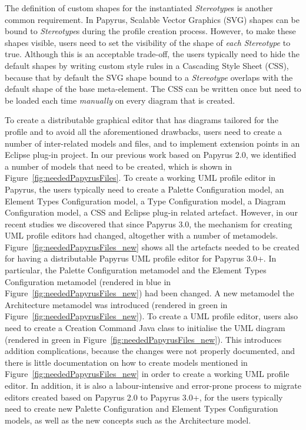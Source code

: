 The definition of custom shapes for the instantiated \textit{Stereotype}s is another common requirement. 
In Papyrus, Scalable Vector Graphics (SVG) shapes can be bound to \textit{Stereotype}s during the profile creation process. 
However, to make these shapes visible, users need to set the visibility of the shape of \textit{each} \textit{Stereotype} to true. 
Although this is an acceptable trade-off, the users typically need to hide the default shapes by writing custom style rules in a Cascading Style Sheet (CSS), because that by default the SVG shape bound to a \textit{Stereotype} overlaps with the default shape of the base meta-element.
The CSS can be written once but need to be loaded each time \textit{manually} on every diagram that is created. 

To create a distributable graphical editor that has diagrams tailored for the profile and to avoid all the aforementioned drawbacks, users need to create a number of inter-related models and files, and to implement extension points in an Eclipse plug-in project. 
In our previous work \cite{zolotas2018towards} based on Papyrus 2.0, we identified a number of models that need to be created, which is shown in Figure~\ref{fig:neededPapyrusFiles}. 
To create a working UML profile editor in Papyrus, the users typically need to create a Palette Configuration model, an Element Types Configuration model, a Type Configuration model, a Diagram Configuration model, a CSS and Eclipse plug-in related artefact.
However, in our recent studies we discovered that since Papyrus 3.0, the mechanism for creating UML profile editors had changed, altogether with a number of metamodels. 
Figure~\ref{fig:neededPapyrusFiles_new} shows all the artefacts needed to be created for having a distributable Papyrus UML profile editor for Papyrus 3.0+.
In particular, the Palette Configuration metamodel and the Element Types Configuration metamodel (rendered in blue in Figure~\ref{fig:neededPapyrusFiles_new}) had been changed. 
A new metamodel the Architecture metamodel was introduced (rendered in green in Figure~\ref{fig:neededPapyrusFiles_new}). 
To create a UML profile editor, users also need to create a Creation Command Java class to initialise the UML diagram (rendered in green in Figure~\ref{fig:neededPapyrusFiles_new}). 
This introduces addition complications, because the changes were not properly documented, and there is little documentation on how to create models mentioned in Figure~\ref{fig:neededPapyrusFiles_new} in order to create a working UML profile editor.
In addition, it is also a labour-intensive and error-prone process to migrate editors created based on Papyrus 2.0 to Papyrus 3.0+, for the users typically need to create new Palette Configuration and Element Types Configuration models, as well as the new concepts such as the Architecture model.

